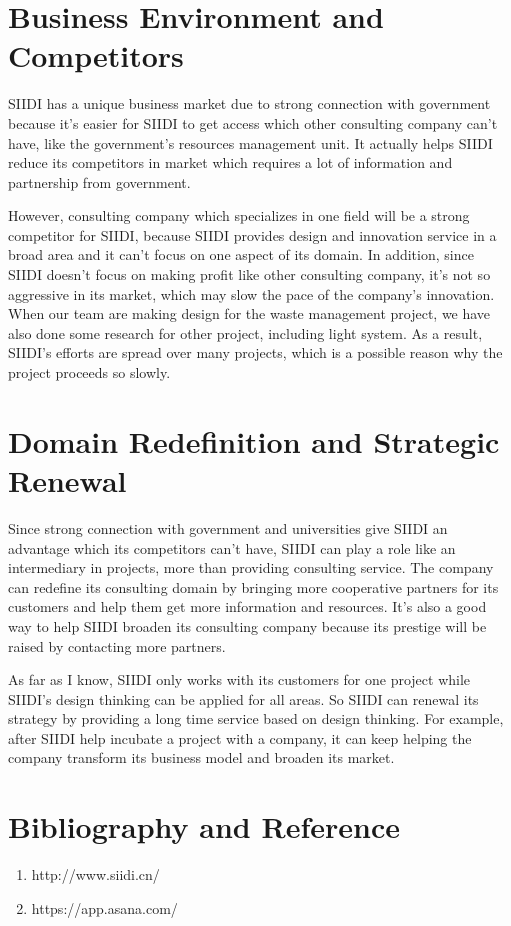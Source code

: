 \documentclass[12pt]{article}
\begin{document}
\section{Business Environment and Competitors}
SIIDI has a unique business market due to strong connection with government because it's easier for SIIDI to get access which other consulting company can't have, like the government's resources management unit. It actually helps SIIDI reduce its competitors in market which requires a lot of information and partnership from government. 
\par However, consulting company which specializes in one field will be a strong competitor for SIIDI, because SIIDI provides design and innovation service in a broad area and it can't focus on one aspect of its domain. In addition, since SIIDI doesn't focus on making profit like other consulting company, it's not so aggressive in its market, which may slow the pace of the company's innovation. When our team are making design for the waste management project, we have also done some research for other project, including light system. As a result, SIIDI's efforts are spread over many projects, which is a possible reason why the project proceeds so slowly. 
\section{Domain Redefinition and Strategic Renewal}
Since strong connection with government and universities give SIIDI an advantage which its competitors can't have, SIIDI can play a role like an intermediary in projects, more than providing consulting service. The company can redefine its consulting domain by bringing more cooperative partners for its customers and help them get more information and resources. It's also a good way to help SIIDI broaden its consulting company because its prestige will be raised by contacting more partners.
\par As far as I know, SIIDI only works with its customers for one project while SIIDI's design thinking  can be applied for all areas. So SIIDI can renewal its strategy by providing a long time service based on design thinking. For example, after SIIDI help incubate a project with a company, it can keep helping the company transform its business model and broaden its market.
\section{Bibliography and Reference}
\begin{enumerate}
\item http://www.siidi.cn/
\item {https://app.asana.com/}
\end{enumerate}
\end{document}

